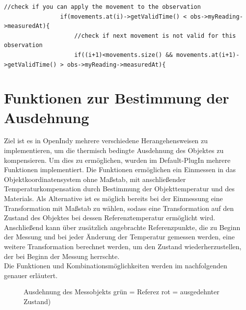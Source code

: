 \begin{lstlisting}[caption={Anwendung mehrerer Movements},captionpos=t]
//check if you can apply the movement to the observation
                if(movements.at(i)->getValidTime() < obs->myReading->measuredAt){
                    //check if next movement is not valid for this observation
                    if((i+1)<movements.size() && movements.at(i+1)->getValidTime() > obs->myReading->measuredAt){
\end{lstlisting}

\section{Funktionen zur Bestimmung der Ausdehnung}\label{sec:funktionen}

Ziel ist es in OpenIndy mehrere verschiedene Herangehensweisen zu implementieren, um die thermisch bedingte Ausdehnung des Objektes zu kompensieren. Um dies zu ermöglichen, wurden im Default-PlugIn mehrere Funktionen implementiert. Die Funktionen ermöglichen ein Einmessen in das Objektkoordinatensystem ohne Maßstab, mit anschließender Temperaturkompensation durch Bestimmung der Objekttemperatur und des Materials. Als Alternative ist es möglich bereits bei der Einmessung eine Transformation mit Maßstab zu wählen, sodass eine Transformation auf den Zustand des Objektes bei dessen Referenztemperatur ermöglicht wird. Anschließend kann über zusätzlich angebrachte Referenzpunkte, die zu Beginn der Messung und bei jeder Änderung der Temperatur gemessen werden, eine weitere Transformation berechnet werden, um den Zustand wiederherzustellen, der bei Beginn der Messung herrschte.\\
Die Funktionen und Kombinationsmöglichkeiten werden im nachfolgenden genauer erläutert.
\begin{figure}[h]
	\label{fig:objektausdehnung}
	\centering
	\caption[Ausdehnung des Messobjekts]{Ausdehnung des Messobjekts grün = Referez rot = ausgedehnter Zustand) \protect\footnotemark}
\end{figure}

